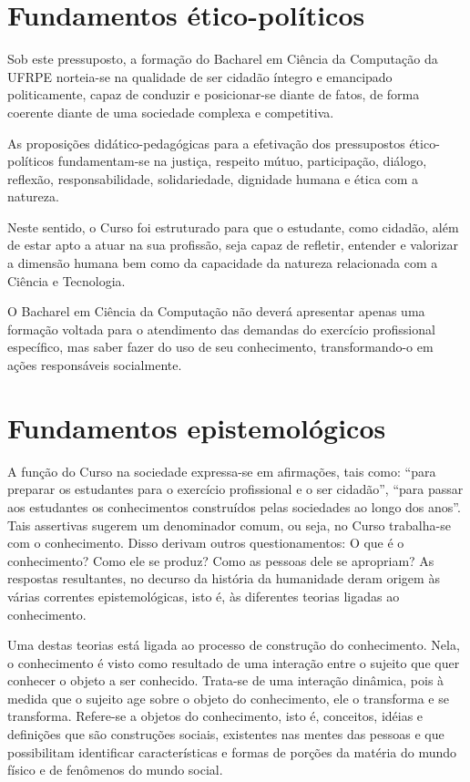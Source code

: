 \documentclass[
	12pt,				%
	openright,			%
  oneside,     %
	a4paper,			%
	english,			%
	french,				%
	spanish,			%
	brazil				%
	]{abntex2}
\begin{document}
\section{Fundamentos ético-políticos}


Sob este pressuposto, a formação do Bacharel em Ciência da Computação da UFRPE
norteia-se na qualidade de ser cidadão íntegro e emancipado politicamente, capaz
de conduzir e posicionar-se diante de fatos, de forma coerente diante de uma
sociedade complexa e competitiva.

As proposições didático-pedagógicas para a efetivação dos pressupostos
ético-políticos fundamentam-se na justiça, respeito mútuo, participação,
diálogo, reflexão, responsabilidade, solidariedade, dignidade humana e ética com
a natureza.

Neste sentido, o Curso foi estruturado para que o estudante, como cidadão, além
de estar apto a atuar na sua profissão, seja capaz de refletir, entender e
valorizar a dimensão humana bem como da capacidade da natureza relacionada com a
Ciência e Tecnologia.

O Bacharel em Ciência da Computação não deverá apresentar apenas uma formação
voltada para o atendimento das demandas do exercício profissional específico,
mas saber fazer do uso de seu conhecimento, transformando-o em ações
responsáveis socialmente.

\section{Fundamentos epistemológicos}


A função do Curso na sociedade expressa-se em afirmações, tais como: ``para
preparar os estudantes para o exercício profissional e o ser cidadão'', ``para
passar aos estudantes os conhecimentos construídos pelas sociedades ao longo dos
anos''. Tais assertivas sugerem um denominador comum, ou seja, no Curso
trabalha-se com o conhecimento. Disso derivam outros questionamentos: O que é o
conhecimento? Como ele se produz? Como as pessoas dele se apropriam? As
respostas resultantes, no decurso da história da humanidade deram origem às
várias correntes epistemológicas, isto é, às diferentes teorias ligadas ao
conhecimento.

Uma destas teorias está ligada ao processo de construção do conhecimento. Nela,
o conhecimento é visto como resultado de uma interação entre o sujeito que quer
conhecer o objeto a ser conhecido. Trata-se de uma interação dinâmica, pois à
medida que o sujeito age sobre o objeto do conhecimento, ele o transforma e se
transforma. Refere-se a objetos do conhecimento, isto é, conceitos, idéias e
definições que são construções sociais, existentes nas mentes das pessoas e que
possibilitam identificar características e formas de porções da matéria do mundo
físico e de fenômenos do mundo social.
\end{document}
